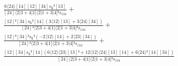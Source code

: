 \documentclass[varwidth, border=5pt]{standalone}
\begin{document}
\begin{my}
$\begin{gathered}
\scriptscriptstyle\frac{6⟨24⟩[14][12][34]s_{𝟓}²[13]}{[24]⟨2|3+4|1]⟨2|1+3|4]²s_{134}} +\\
\scriptscriptstyle\frac{[12]²[34]s_{𝟓}²[14](3⟨12⟩[13]+3⟨24⟩[34])}{[24]²⟨2|3+4|1]⟨2|1+3|4]²s_{134}} +\\
\scriptscriptstyle\frac{[12]³[34]²s_{𝟓}²(-2⟨12⟩[14]+2⟨23⟩[34])}{[24]³⟨2|3+4|1]⟨2|1+3|4]²s_{134}} +\\
\scriptscriptstyle\frac{[12][34]s_{𝟓}²[14](6⟨12⟩⟨23⟩[13]²+12⟨12⟩⟨24⟩[13][14]+6⟨24⟩²[14][34])}{[24]⟨2|3+4|1]⟨2|1+3|4]³s_{134}} \phantom{+}
\end{gathered}$
\end{my}
\end{document}
